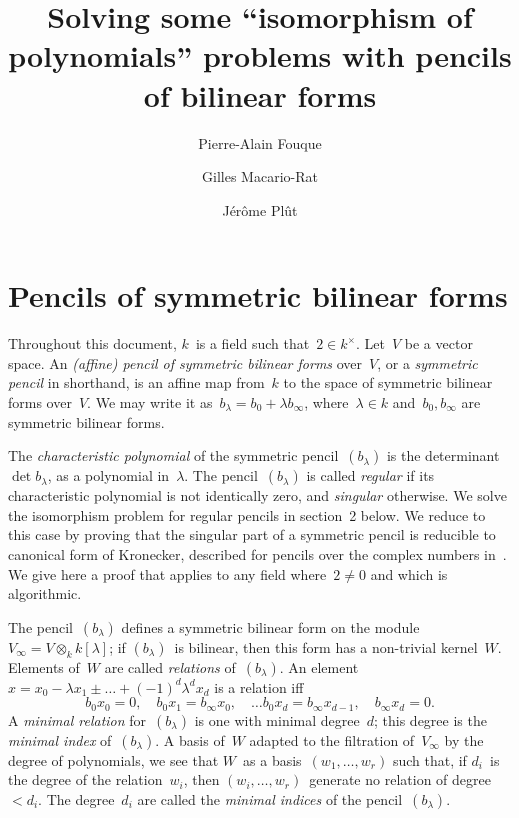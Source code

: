 \documentclass{article}%
\begin{document}
\title{Solving some ``isomorphism of polynomials'' problems with pencils of
bilinear forms}
\author{Pierre-Alain Fouque \and Gilles Macario-Rat \and Jérôme Plût}
\maketitle

\section{Pencils of symmetric bilinear forms}%

Throughout this document, $k$~is a field such that~$2 ∈ k^{×}$. Let~$V$
be a vector space. An \emph{(affine) pencil of symmetric bilinear forms}
over~$V$, or a \emph{symmetric pencil} in shorthand, is an affine map
from~$k$ to the space of symmetric bilinear forms over~$V$. We may write
it as~$b_{λ} = b_{0} + λ b_{∞}$, where~$λ ∈ k$ and~$b_{0}, b_{∞}$ are
symmetric bilinear forms.

The \emph{characteristic polynomial} of the symmetric pencil~$(b_{λ})$ is
the determinant~$\det b_{λ}$, as a polynomial in~$λ$. The
pencil~$(b_{λ})$ is called \emph{regular} if its characteristic
polynomial is not identically zero, and \emph{singular} otherwise. We
solve the isomorphism problem for regular pencils in section 2 below. We
reduce to this case by proving that the singular part of a symmetric
pencil is reducible to canonical form of Kronecker, described for pencils
over the complex numbers in~\cite[XII(56)]{Gantmacher2}. We give here a
proof that applies to any field where~$2 ≠ 0$ and which is algorithmic.

\bigskip

The pencil~$(b_{λ})$ defines a symmetric bilinear form on the
module~$V_{∞} = V ⊗_{k} k[λ]$; if $(b_{λ})$~is bilinear, then this form
has a non-trivial kernel~$W$. Elements of~$W$ are called \emph{relations}
of~$(b_{λ})$. An element~$x = x_0 - λ x_1 ± … + (-1)^d λ^d x_d$ is a
relation iff
\begin{equation}\label{eq:relation}
b_0 x_0 = 0, \quad
b_0 x_1 = b_{∞} x_0, \quad …
b_0 x_d = b_{∞} x_{d-1}, \quad
b_{∞} x_{d} = 0.
\end{equation}
A \emph{minimal relation} for~$(b_{λ})$ is one with minimal degree~$d$;
this degree is the \emph{minimal index} of~$(b_{λ})$. A basis
of~$W$ adapted to the filtration of~$V_{∞}$ by the degree of polynomials,
we see that $W$~as a basis~$(w_1,…,w_r)$ such that, if $d_i$~is the
degree of the relation~$w_i$, then $(w_i,…,w_r)$~generate no relation of
degree~$< d_i$. The degree~$d_i$ are called the \emph{minimal indices} of
the pencil~$(b_{λ})$.
\end{document}
